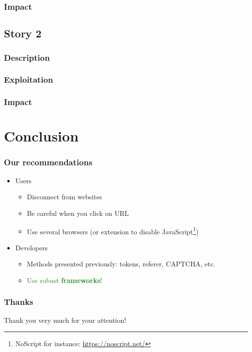 \documentclass[svgnames]{beamer}
\begin{document}
\begin{frame}
  \frametitle{Impact}
\end{frame}


\subsection{Story 2} %

\begin{frame}
  \frametitle{Description}
\end{frame}

\begin{frame}
  \frametitle{Exploitation}
\end{frame}

\begin{frame}
  \frametitle{Impact}
\end{frame}

\section*{Conclusion}
\begin{frame}
  \frametitle{Our recommendations}
  \begin{itemize}
   \item Users
   \pause
   \begin{itemize}
    \item Disconnect from websites
    \item Be careful when you click on URL %
    \item Use several browsers (or extension to disable JavaScript\footnote{NoScript for instance: \url{https://noscript.net/}})
   \end{itemize}
   \pause
   \item Developers
   \begin{itemize}
    \item Methods presented previously: tokens, referer, CAPTCHA, etc.
    \pause
    \item \textcolor{ForestGreen}{Use robust \textbf{frameworks}!} %
   \end{itemize}

  \end{itemize}
\end{frame}


\begin{frame}
  \frametitle{Thanks}
  \begin{center}
    Thank you very much for your attention!
  \end{center}
\end{frame}
\end{document}
